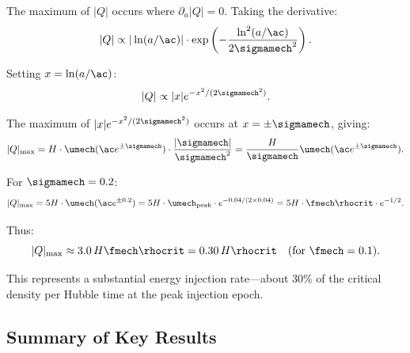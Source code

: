 The maximum of $|Q|$ occurs where $\partial_a|Q| = 0$. Taking the derivative:
\begin{equation}
|Q| \propto |\ln(a/\ac)| \cdot \exp\left(-\frac{\ln^2(a/\ac)}{2\sigmamech^2}\right).
\end{equation}

Setting $x = \ln(a/\ac)$:
\begin{equation}
|Q| \propto |x| e^{-x^2/(2\sigmamech^2)}.
\end{equation}

The maximum of $|x|e^{-x^2/(2\sigmamech^2)}$ occurs at $x = \pm\sigmamech$, giving:
\begin{equation}
|Q|_{\max} = H \cdot \umech(\ac e^{\pm\sigmamech}) \cdot \frac{|\sigmamech|}{\sigmamech^2} = \frac{H}{\sigmamech} \umech(\ac e^{\pm\sigmamech}).
\end{equation}

For $\sigmamech = 0.2$:
\begin{equation}
|Q|_{\max} = 5 H \cdot \umech(\ac e^{\pm 0.2}) = 5 H \cdot \umech_{\mathrm{peak}} \cdot e^{-0.04/(2\times 0.04)} = 5 H \cdot \fmech \rhocrit \cdot e^{-1/2}.
\end{equation}

Thus:
\begin{equation}
|Q|_{\max} \approx 3.0 \, H \fmech \rhocrit = 0.30 \, H \rhocrit \quad \text{(for } \fmech = 0.1\text{)}.
\end{equation}

This represents a substantial energy injection rate---about 30\% of the critical density per Hubble time at the peak injection epoch.



\subsection{Summary of Key Results}
\label{sec:summary_wmech_Q}

